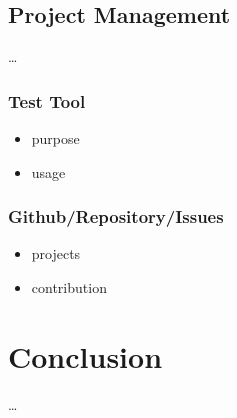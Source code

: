 \documentclass[10pt,a4paper]{report}
\begin{document}
\section{Project Management}
\label{sec:Project Management}
\ldots

\subsection{Test Tool}
\label{sub:Test Tool}
\begin{itemize}
\item purpose
\item usage
\end{itemize}

\subsection{Github/Repository/Issues}
\label{sub:Github/Repository/Issues}
\begin{itemize}
\item projects
\item contribution
\end{itemize}

\chapter{Conclusion}
\label{chap:Conclusion}
\ldots
\end{document}
